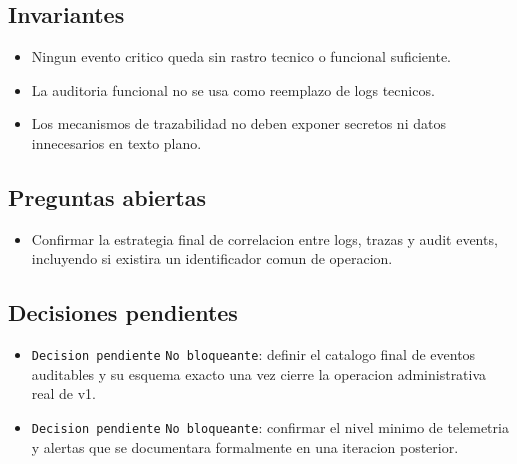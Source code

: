 \subsection{Invariantes}

\begin{itemize}
  \item Ningun evento critico queda sin rastro tecnico o funcional suficiente.
  \item La auditoria funcional no se usa como reemplazo de logs tecnicos.
  \item Los mecanismos de trazabilidad no deben exponer secretos ni datos innecesarios en texto plano.
\end{itemize}

\subsection{Preguntas abiertas}

\begin{itemize}
  \item Confirmar la estrategia final de correlacion entre logs, trazas y audit events, incluyendo si existira un identificador comun de operacion.
\end{itemize}

\subsection{Decisiones pendientes}

\begin{itemize}
  \item \texttt{Decision pendiente} \texttt{No bloqueante}: definir el catalogo final de eventos auditables y su esquema exacto una vez cierre la operacion administrativa real de v1.
  \item \texttt{Decision pendiente} \texttt{No bloqueante}: confirmar el nivel minimo de telemetria y alertas que se documentara formalmente en una iteracion posterior.
\end{itemize}
